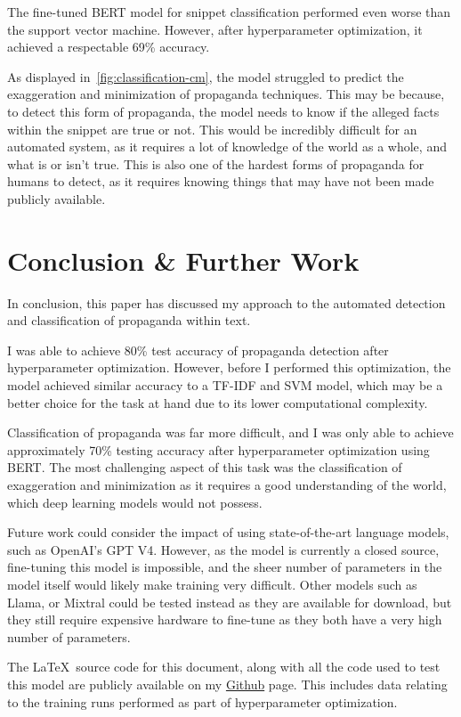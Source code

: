 \documentclass[twocolumn]{article}
\begin{document}
The fine-tuned BERT model for snippet classification performed even worse than the support vector machine. However, after hyperparameter optimization, it achieved a respectable 69\% accuracy. 

As displayed in~\autoref{fig:classification-cm}, the model struggled to predict the exaggeration and minimization of propaganda techniques. This may be because, to detect this form of propaganda, the model needs to know if the alleged facts within the snippet are true or not. This would be incredibly difficult for an automated system, as it requires a lot of knowledge of the world as a whole, and what is or isn't true. This is also one of the hardest forms of propaganda for humans to detect, as it requires knowing things that may have not been made publicly available.  

\section{Conclusion \& Further Work}

In conclusion, this paper has discussed my approach to the automated detection and classification of propaganda within text. 

I was able to achieve 80\% test accuracy of propaganda detection after hyperparameter optimization. However, before I performed this optimization, the model achieved similar accuracy to a TF-IDF and SVM model, which may be a better choice for the task at hand due to its lower computational complexity. 

Classification of propaganda was far more difficult, and I was only able to achieve approximately 70\% testing accuracy after hyperparameter optimization using BERT. The most challenging aspect of this task was the classification of exaggeration and minimization as it requires a good understanding of the world, which deep learning models would not possess. 

Future work could consider the impact of using state-of-the-art language models, such as OpenAI's GPT V4. However, as the model is currently a closed source, fine-tuning this model is impossible, and the sheer number of parameters in the model itself would likely make training very difficult. Other models such as Llama, or Mixtral could be tested instead as they are available for download, but they still require expensive hardware to fine-tune as they both have a very high number of parameters. 

The \LaTeX~source code for this document, along with all the code used to test this model are publicly available on my \href{https://github.com/Henry-Ash-Williams/ANLE-Propaganda}{Github} page. This includes data relating to the training runs performed as part of hyperparameter optimization.


\printbibliography
\end{document}
